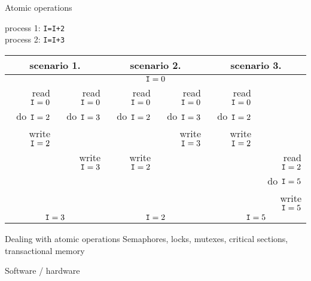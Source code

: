 \begin{numberedframe}{Atomic operations}
\begin{tabbing}
  process 1: \texttt{I=I+2}\\
  process 2: \texttt{I=I+3}
\end{tabbing}
\footnotesize
\begin{tabular}{rrrrrr}
  \toprule
  \multicolumn{2}{c}{scenario 1.}& \multicolumn{2}{|c|}{scenario 2.}&
  \multicolumn{2}{c}{scenario 3.}\\ \midrule
  \multicolumn{6}{c}{$\n{I}=0$}\\ \midrule
  read $\n{I}=0$&read $\n{I}=0$&
    read $\n{I}=0$&read $\n{I}=0$&
      read $\n{I}=0$& \\
  do $\n{I}=2$&do $\n{I}=3$& 
    do $\n{I}=2$&do $\n{I}=3$&
      do $\n{I}=2$& \\
  write $\n{I}=2$& & &write $\n{I}=3$&write $\n{I}=2$& \\
  &write $\n{I}=3$&write $\n{I}=2$& & &read $\n{I}=2$\\
  &&&&&do $\n{I}=5$\\
  &&&&&write $\n{I}=5$\\
  \midrule
  \multicolumn{2}{c}{$\n{I}=3$}& \multicolumn{2}{c}{$\n{I}=2$}&
  \multicolumn{2}{c}{$\n{I}=5$}\\ 
  \bottomrule
\end{tabular}
\end{numberedframe}

\begin{numberedframe}{Dealing with atomic operations}
  Semaphores, locks, mutexes, critical sections, transactional memory

  Software / hardware
\end{numberedframe}

